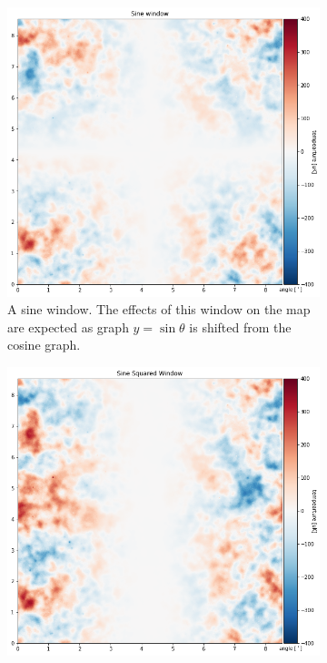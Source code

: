\documentclass[12pt]{article}
\begin{document}
\begin{figure}[H]
     \centering
     \begin{subfigure}[t]{0.49\textwidth}
         \centering
         \includegraphics[width=\textwidth]{images/sine.png}
         \caption{A sine window. The effects of this window on the map are expected as graph $y=\sin\theta$ is shifted from the cosine graph.}
         \label{fig:sine_window}
     \end{subfigure}
     \hfill
     \begin{subfigure}[t]{0.49\textwidth}
         \centering
         \includegraphics[width=\textwidth]{images/sine squared.png}

\end{subfigure}
\end{figure}
\end{document}
